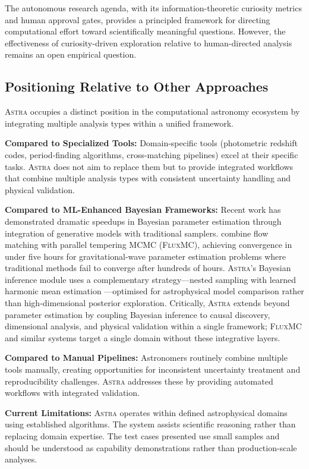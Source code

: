 \documentclass[usenatbib]{rasti}
\newcommand{\astra}{\textsc{Astra}\xspace}
\begin{document}
The autonomous research agenda, with its information-theoretic curiosity metrics and human approval gates, provides a principled framework for directing computational effort toward scientifically meaningful questions.
However, the effectiveness of curiosity-driven exploration relative to human-directed analysis remains an open empirical question.

\subsection{Positioning Relative to Other Approaches}
\label{sec:discussion:positioning}

\astra occupies a distinct position in the computational astronomy ecosystem by integrating multiple analysis types within a unified framework.

\textbf{Compared to Specialized Tools:}
Domain-specific tools (photometric redshift codes, period-finding algorithms, cross-matching pipelines) excel at their specific tasks.
\astra does not aim to replace them but to provide integrated workflows that combine multiple analysis types with consistent uncertainty handling and physical validation.

\textbf{Compared to ML-Enhanced Bayesian Frameworks:}
Recent work has demonstrated dramatic speedups in Bayesian parameter estimation through integration of generative models with traditional samplers.
\citet{Liang2026} combine flow matching with parallel tempering MCMC (\textsc{FluxMC}), achieving convergence in under five hours for gravitational-wave parameter estimation problems where traditional methods fail to converge after hundreds of hours.
\astra's Bayesian inference module uses a complementary strategy---nested sampling with learned harmonic mean estimation \citep{SpurioMancini+2023}---optimised for astrophysical model comparison rather than high-dimensional posterior exploration.
Critically, \astra extends beyond parameter estimation by coupling Bayesian inference to causal discovery, dimensional analysis, and physical validation within a single framework; \textsc{FluxMC} and similar systems target a single domain without these integrative layers.

\textbf{Compared to Manual Pipelines:}
Astronomers routinely combine multiple tools manually, creating opportunities for inconsistent uncertainty treatment and reproducibility challenges.
\astra addresses these by providing automated workflows with integrated validation.

\textbf{Current Limitations:}
\astra operates within defined astrophysical domains using established algorithms.
The system assists scientific reasoning rather than replacing domain expertise.
The test cases presented use small samples and should be understood as capability demonstrations rather than production-scale analyses.
\end{document}
